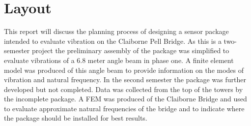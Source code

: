 \section{Layout} 

This report will discuss the planning process of designing a sensor package intended to evaluate vibration on the Claiborne Pell Bridge. As this is a
two-semester project the preliminary assembly of the package was simplified to evaluate vibrations of a 6.8 meter angle beam in phase one. A finite element
model was produced of this angle beam to provide information on the modes of vibration and natural frequency. In the second semester the package was
further developed but not completed. Data was collected from the top of the towers by the incomplete package. A FEM was produced of the Claiborne Bridge
and used to evaluate approximate natural frequencies of the bridge and to indicate where the package should be installed for best results. \\


